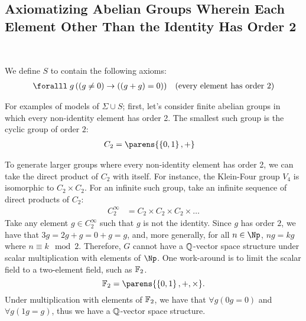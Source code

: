 \bigskip

\subsection{Axiomatizing Abelian Groups Wherein Each Element Other Than the Identity
Has Order 2}~\label{sec:axiomatizing-abelian-groups-order-two}


We define $S$ to contain the following axioms:
\begin{align}
  \forall g\, ( (g \neq 0) \lto ((g + g) &= 0) ) &\text{(every element has order 2)}
\end{align}

\bigskip
For examples of models of $\Sigma \cup S$;
first, let's consider finite abelian groups in which every non-identity
element has order 2.
The smallest such group is the cyclic group of order $2$:
\begin{align*}
  C_2 &= \parens{ \set{0, 1}, + }
\end{align*}

To generate larger groups where every non-identity element has order 2,
we can take the direct product of $C_2$ with itself.
For instance, the Klein-Four group $V_4$ is isomorphic to $C_2 \times C_2$.
For an infinite such group, take an infinite sequence of direct products of $C_2$:
\begin{align*}
  C_2^{\infty} &= C_2 \times C_2 \times C_2 \times \ldots
\end{align*}
Take any element $g \in C_2^{\infty}$ such that $g$ is not the identity.
Since $g$ has order $2$, we have that $3g = 2g + g = 0 + g = g$,
and, more generally, for all $n \in \Np$, $ng = k g$ where $n \equiv k \mod 2$.
Therefore, $G$ cannot have a $\mathbb{Q}$-vector space structure under scalar multiplication
with elements of $\Np$.
One work-around is to limit the scalar field to a two-element field,
such as $\mathbb{F}_2$.
\[ \F_2 = \parens{\set{0, 1}, +, \times}. \]
Under multiplication with elements of $\mathbb{F}_2$, we have that
$\forall g (0g = 0)$ and $\forall g (1g = g)$, thus we have a
$\mathbb{Q}$-vector space structure.
